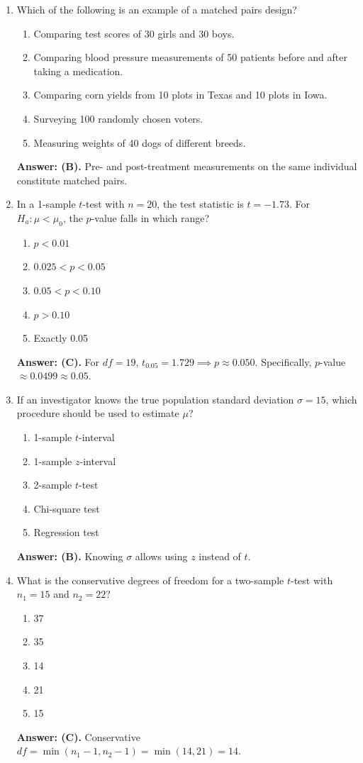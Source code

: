 \begin{enumerate}[resume, leftmargin=1.5em]
  \item Which of the following is an example of a matched pairs design?
  \begin{enumerate}[label=(\Alph*)]
    \item Comparing test scores of 30 girls and 30 boys.
    \item Comparing blood pressure measurements of 50 patients before and after taking a medication.
    \item Comparing corn yields from 10 plots in Texas and 10 plots in Iowa.
    \item Surveying 100 randomly chosen voters.
    \item Measuring weights of 40 dogs of different breeds.
  \end{enumerate}
  \textbf{Answer: (B).} Pre- and post-treatment measurements on the same individual constitute matched pairs.

  \item In a 1-sample $t$-test with $n = 20$, the test statistic is $t = -1.73$. For $H_a: \mu < \mu_0$, the $p$-value falls in which range?
  \begin{enumerate}[label=(\Alph*)]
    \item $p < 0.01$ \item $0.025 < p < 0.05$ \item $0.05 < p < 0.10$ \item $p > 0.10$ \item Exactly 0.05
  \end{enumerate}
  \textbf{Answer: (C).} For $df = 19$, $t_{0.05} = 1.729 \implies p \approx 0.050$. Specifically, $p$-value $\approx 0.0499 \approx 0.05$.

  \item If an investigator knows the true population standard deviation $\sigma = 15$, which procedure should be used to estimate $\mu$?
  \begin{enumerate}[label=(\Alph*)]
    \item 1-sample $t$-interval \item 1-sample $z$-interval \item 2-sample $t$-test \item Chi-square test \item Regression test
  \end{enumerate}
  \textbf{Answer: (B).} Knowing $\sigma$ allows using $z$ instead of $t$.

  \item What is the conservative degrees of freedom for a two-sample $t$-test with $n_1 = 15$ and $n_2 = 22$?
  \begin{enumerate}[label=(\Alph*)]
    \item 37 \item 35 \item 14 \item 21 \item 15
  \end{enumerate}
  \textbf{Answer: (C).} Conservative $df = \min(n_1 - 1, n_2 - 1) = \min(14, 21) = 14$.


\end{enumerate}
